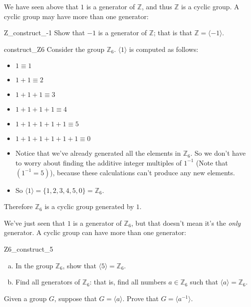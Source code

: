 We have seen above that $1$ is a generator of $\mathbb Z$, and thus $\mathbb Z$ is a cyclic group.
A cyclic group may have more than one generator: 

\begin{exercise}{Z_construct_-1}
Show that $-1$ is a generator of $\mathbb Z$; that is that $\mathbb Z = \langle -1 \rangle$.
\end{exercise} 
 
\begin{example}{construct_Z6}
Consider the group ${\mathbb Z}_6$.  $\langle 1 \rangle$ is computed as follows:
\begin{itemize}
\item
$1 \equiv 1$
\item
$1 + 1 \equiv 2$ 
\item
$1 + 1 + 1 \equiv 3$ 
\item
$1 + 1 + 1 + 1 \equiv 4$ 
\item
$1 + 1 + 1 + 1 + 1 \equiv 5$ 
\item
$1 + 1 + 1 + 1 + 1 + 1 \equiv 0$
\item
Notice that we've already generated all the elements in ${\mathbb Z}_6$. So we don't have to worry about finding the additive integer multiples of $1^{-1}$ (Note that $(1^{-1} = 5)$), because these calculations can't produce any new elements.
\item
So $\langle 1 \rangle = \{1, 2, 3, 4, 5, 0 \} = {\mathbb Z}_6$.
\end{itemize}

\noindent
Therefore ${\mathbb Z}_6$ is a cyclic group generated by $1$.
\end{example}

We've just seen that $1$ is a generator of ${\mathbb Z}_6$,  but that doesn't mean it's the \emph{only} generator.  A cyclic group can have more than one generator:

\begin{exercise}{Z6_construct_5}
\begin{enumerate}[(a)]
\item
In the group ${\mathbb Z}_6$, show that $\langle 5 \rangle = {\mathbb Z}_6$.
\item
Find all generators of ${\mathbb Z}_6$: that is, find all numbers $a \in {\mathbb Z}_6$ such that $\langle a \rangle = {\mathbb Z}_6$. 
\end{enumerate}
\end{exercise}

\begin{exercise}{82}
Given a group $G$, suppose that $G = \langle a \rangle$.  Prove that $G = \langle a^{-1} \rangle$.
\end{exercise}

